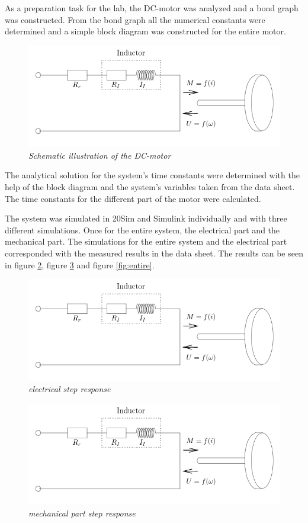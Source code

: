 \documentclass[12pt,a4paper]{article}
\begin{document}
As a preparation task for the lab, the DC-motor was analyzed and a bond graph was constructed. From the bond graph all the numerical constants were determined and a simple block diagram was constructed for the entire motor.
\begin{figure}
  \centering
  \includegraphics[width=1\linewidth]{schematicdcmotor.png}
  \caption{\emph{Schematic illustration of the DC-motor}}
  \label{fig:dcmoto}
\end{figure}
The analytical solution for the system's time constants were determined with the help of the block diagram and the system's variables taken from the data sheet. The time constants for the different part of the motor were calculated.

The system was simulated in 20Sim and Simulink individually and with three different simulations. Once for the entire system, the electrical part and the mechanical part. The simulations for the entire system and the electrical part corresponded with the measured results in the data sheet. The results can be seen in figure \ref{fig:electrical}, figure \ref{fig:mechanical} and figure \ref{fig:entire}.
\begin{figure}
  \centering
  \includegraphics[width=.4\linewidth]{schematicdcmotor.png}
  \caption{\emph{electrical step response}}
  \label{fig:electrical}
\end{figure}

\begin{figure}
  \centering
  \includegraphics[width=.4\linewidth]{schematicdcmotor.png}

  \caption{\emph{mechanical part step response}}
  \label{fig:mechanical}
\end{figure}
\end{document}
